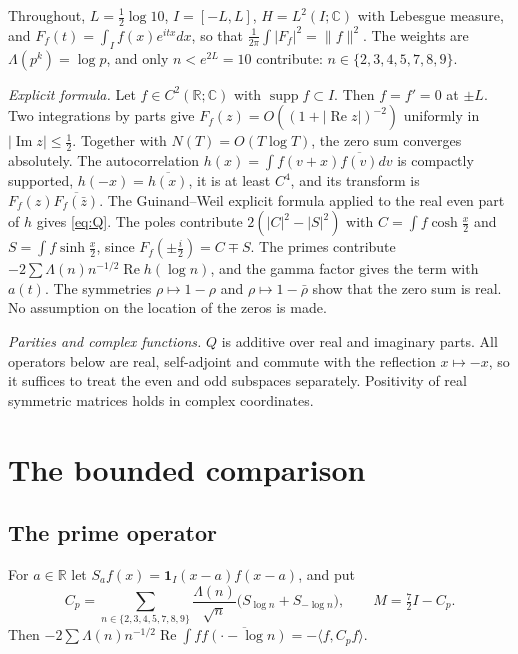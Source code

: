 \documentclass[11pt]{amsart}
\theoremstyle{remark}
\numberwithin{equation}{section}
\newcommand{\R}{\mathbb{R}}
\newcommand{\C}{\mathbb{C}}
\begin{document}
Throughout, $L=\frac12\log10$, $I=[-L,L]$, $H=L^2(I;\C)$ with Lebesgue measure, and $F_f(t)=\int_If(x)e^{itx}dx$, so that $\frac1{2\pi}\int|F_f|^2=\|f\|^2$. The weights are $\Lambda(p^k)=\log p$, and only $n<e^{2L}=10$ contribute: $n\in\{2,3,4,5,7,8,9\}$.

\emph{Explicit formula.} Let $f\in C^2(\R;\C)$ with $\operatorname{supp}f\subset I$. Then $f=f'=0$ at $\pm L$. Two integrations by parts give $F_f(z)=O((1+|\operatorname{Re}z|)^{-2})$ uniformly in $|\operatorname{Im}z|\le\frac12$. Together with $N(T)=O(T\log T)$, the zero sum converges absolutely. The autocorrelation $h(x)=\int f(v+x)\overline{f(v)}dv$ is compactly supported, $h(-x)=\overline{h(x)}$, it is at least $C^4$, and its transform is $F_f(z)\overline{F_f(\bar z)}$. The Guinand--Weil explicit formula applied to the real even part of $h$ gives \eqref{eq:Q}. The poles contribute $2(|C|^2-|S|^2)$ with $C=\int f\cosh\frac x2$ and $S=\int f\sinh\frac x2$, since $F_f(\pm\frac i2)=C\mp S$. The primes contribute $-2\sum\Lambda(n)n^{-1/2}\operatorname{Re}h(\log n)$, and the gamma factor gives the term with $a(t)$. The symmetries $\rho\mapsto1-\rho$ and $\rho\mapsto1-\bar\rho$ show that the zero sum is real. No assumption on the location of the zeros is made.

\emph{Parities and complex functions.} $Q$ is additive over real and imaginary parts. All operators below are real, self-adjoint and commute with the reflection $x\mapsto-x$, so it suffices to treat the even and odd subspaces separately. Positivity of real symmetric matrices holds in complex coordinates.

\section{The bounded comparison}\label{sec:comparison}

\subsection{The prime operator}
For $a\in\R$ let $S_af(x)=\mathbf 1_I(x-a)f(x-a)$, and put
\[
C_p=\sum_{n\in\{2,3,4,5,7,8,9\}}\frac{\Lambda(n)}{\sqrt n}\bigl(S_{\log n}+S_{-\log n}\bigr),\qquad M=\tfrac72I-C_p .
\]
Then $-2\sum\Lambda(n)n^{-1/2}\operatorname{Re}\int f\overline{f(\cdot-\log n)}=-\langle f,C_pf\rangle$.
\end{document}
